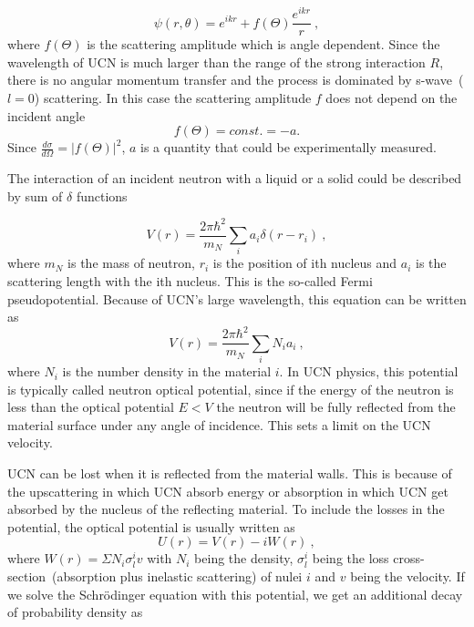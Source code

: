 \begin{equation}
  \psi(r, \theta) = e^{ikr} + f(\Theta)\frac{e^{ikr}}{r}~,
\end{equation}
where $f(\Theta)$ is the scattering amplitude which is angle
dependent. Since the wavelength of UCN is much larger than the range
of the strong interaction $R$, there is no angular momentum transfer
and the process is dominated by s-wave~($l = 0$) scattering. In this
case the scattering amplitude $f$ does not depend on the incident
angle
\begin{equation}
f(\Theta) = const. = -a.
\end{equation}
Since $\frac{d\sigma}{d\Omega} = |f(\Theta)|^2$, $a$ is a quantity
that could be experimentally measured.


The interaction of an incident neutron with a liquid or a solid could
be described by sum of $\delta$ functions

\begin{equation}
  \label{eqn:vFermi}
  V(r) = \frac{2\pi \hbar^2}{m_N} \sum_i a_i \delta (r - r_i)~,
\end{equation}
where $m_N$ is the mass of neutron, $r_i$ is the position of ith
nucleus and $a_i$ is the scattering length with the ith nucleus. This
is the so-called Fermi pseudopotential. Because of UCN's large
wavelength, this equation can be written as
\begin{equation}
V(r) = \frac{2\pi \hbar^2}{m_N}\sum_i N_ia_i~,
\end{equation}
where $N_i$ is the number density in the material $i$. In UCN physics,
this potential is typically called neutron optical potential, since if
the energy of the neutron is less than the optical potential $E < V$
the neutron will be fully reflected from the material surface under
any angle of incidence. This sets a limit on the UCN velocity.

UCN can be lost when it is reflected from the material walls.
This is because of the upscattering in which UCN absorb energy or
absorption in which UCN get absorbed by the nucleus of the reflecting
material. To include the losses in the potential, the optical
potential is usually written as
\begin{equation}
  U(r) = V(r) - iW(r)~,
\end{equation}
where $W(r) = \Sigma N_i \sigma^i_l v$ with $N_i$ being the density,
$\sigma^i_l$ being the loss cross-section~(absorption plus inelastic
scattering) of nulei $i$ and $v$ being the velocity. If we solve the
Schr\"{o}dinger equation with this potential, we get an additional
decay of probability density as

